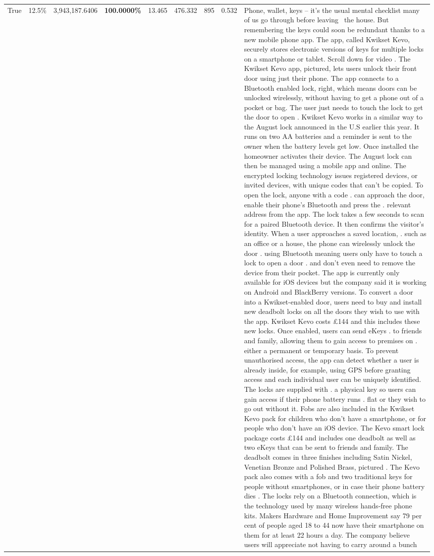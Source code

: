 \begin{table}[H]
\begin{tabular}{lllrlllll}
True & 12.5\% & 3,943,187.6406 & \bfseries \color{red} 100.0000\% & 13.465 & 476.332 & 895 & 0.532 & Phone, wallet, keys – it’s the usual mental checklist many of us go through before leaving  the house. But remembering the keys could soon be redundant thanks to a new mobile phone app. The app, called Kwikset Kevo, securely stores electronic versions of keys for multiple locks on a smartphone or tablet. Scroll down for video . The Kwikset Kevo app, pictured, lets users unlock their front door using just their phone. The app connects to a Bluetooth enabled lock, right, which means doors can be unlocked wirelessly, without having to get a phone out of a pocket or bag. The user just needs to touch the lock to get the door to open . Kwikset Kevo works in a similar way to the August lock announced in the U.S earlier this year. It runs on two AA batteries and a reminder is sent to the owner when the battery levels get low. Once installed the homeowner activates their device. The August lock can then be managed using a mobile app and online. The encrypted locking technology issues registered devices, or invited devices, with unique codes that can't be copied. To open the lock, anyone with a code . can approach the door, enable their phone's Bluetooth and press the . relevant address from the app. The lock takes a few seconds to scan for a paired Bluetooth device. It then confirms the visitor's identity. When a user approaches a saved location, . such as an office or a house, the phone can wirelessly unlock the door . using Bluetooth meaning users only have to touch a lock to open a door . and don't even need to remove the device from their pocket. The app is currently only available for iOS devices but the company said it is working on Android and BlackBerry versions. To convert a door into a Kwikset-enabled door, users need to buy and install new deadbolt locks on all the doors they wish to use with the app. Kwikset Kevo costs £144 and this includes these new locks. Once enabled, users can send eKeys . to friends and family, allowing them to gain access to premises on . either a permanent or temporary basis. To prevent unauthorised access, the app can detect whether a user is already inside, for example, using GPS before granting access and each individual user can be uniquely identified. The locks are supplied with . a physical key so users can gain access if their phone battery runs . flat or they wish to go out without it. Fobs are also included in the Kwikset Kevo pack for children who don't have a smartphone, or for people who don't have an iOS device. The Kevo smart lock package costs £144 and includes one deadbolt as well as two eKeys that can be sent to friends and family. The deadbolt comes in three finishes including Satin Nickel, Venetian Bronze and Polished Brass, pictured . The Kevo pack also comes with a fob and two traditional keys for people without smartphones, or in case their phone battery dies . The locks rely on a Bluetooth connection, which is the technology used by many wireless hands-free phone kits. Makers Hardware and Home Improvement say 79 per cent of people aged 18 to 44 now have their smartphone on them for at least 22 hours a day. The company believe users will appreciate not having to carry around a bunch 
\end{tabular}
\end{table}
